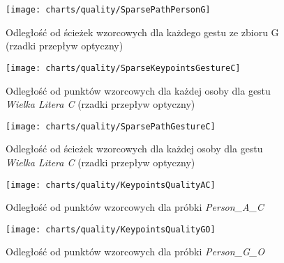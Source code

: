       \begin{figure}[!ht]
        \centering
        \texttt{[image: charts/quality/SparsePathPersonG]}
        \caption[Odległość od ścieżek wzorcowych dla każdego gestu (rzadki przepływ optyczny)]
                {Odległość od ścieżek wzorcowych dla każdego gestu ze zbioru G\\(rzadki przepływ optyczny)}
        \label{fig:SparsePathPersonG}
      \end{figure}

    \newpage
      \begin{figure}[!ht]
        \centering
        \texttt{[image: charts/quality/SparseKeypointsGestureC]}
        \caption[Odległość od punktów wzorcowych dla każdej osoby dla gestu C (rzadki przepływ optyczny)]
                {Odległość od punktów wzorcowych dla każdej osoby dla gestu\\\textit{Wielka Litera C} (rzadki przepływ optyczny)}
        \label{fig:SparseKeypointsGestureC}
      \end{figure}

      \begin{figure}[!ht]
        \centering
        \texttt{[image: charts/quality/SparsePathGestureC]}
        \caption[Odległość od ścieżek wzorcowych dla każdej osoby dla gestu C (rzadki przepływ optyczny)]
                {Odległość od ścieżek wzorcowych dla każdej osoby dla gestu\\\textit{Wielka Litera C} (rzadki przepływ optyczny)}
        \label{fig:SparsePathGestureC}
      \end{figure}

    \newpage
      \begin{figure}[!ht]
        \centering
        \texttt{[image: charts/quality/KeypointsQualityAC]}
        \caption[Odległość od punktów wzorcowych (próbka osoby A, gest C)]
                {Odległość od punktów wzorcowych dla próbki \textit{Person\_A\_C}}
        \label{fig:KeypointsQualityAC}
      \end{figure}

      \begin{figure}[!ht]
        \centering
        \texttt{[image: charts/quality/KeypointsQualityGO]}
        \caption[Odległość od punktów wzorcowych (próbka osoby G, gest O)]
                {Odległość od punktów wzorcowych dla próbki \textit{Person\_G\_O}}
        \label{fig:KeypointsQualityGO}
      \end{figure}

